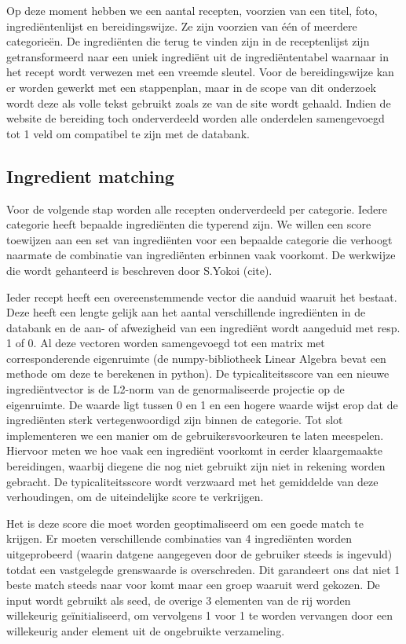 \documentclass{hogent-article}
\begin{document}
Op deze moment hebben we een aantal recepten, voorzien van een titel, foto, ingrediëntenlijst en bereidingswijze. Ze zijn voorzien van één of meerdere categorieën. De ingrediënten die terug te vinden zijn in de receptenlijst zijn getransformeerd naar een uniek ingrediënt uit de ingrediëntentabel waarnaar in het recept wordt verwezen met een vreemde sleutel. Voor de bereidingswijze kan er worden gewerkt met een stappenplan, maar in de scope van dit onderzoek wordt deze als volle tekst gebruikt zoals ze van de site wordt gehaald. Indien de website de bereiding toch onderverdeeld worden alle onderdelen samengevoegd tot 1 veld om compatibel te zijn met de databank.

\subsection{Ingredient matching}%

Voor de volgende stap worden alle recepten onderverdeeld per categorie. Iedere categorie heeft bepaalde ingrediënten die typerend zijn. We willen een score toewijzen aan een set van ingrediënten voor een bepaalde categorie die verhoogt naarmate de combinatie van ingrediënten erbinnen vaak voorkomt. De werkwijze die wordt gehanteerd is beschreven door S.Yokoi (cite).

Ieder recept heeft een overeenstemmende vector die aanduid waaruit het bestaat. Deze heeft een lengte gelijk aan het aantal verschillende ingrediënten in de databank en de aan- of afwezigheid van een ingrediënt wordt aangeduid met resp. 1 of 0. Al deze vectoren worden samengevoegd tot een matrix met  corresponderende eigenruimte (de numpy-bibliotheek Linear Algebra bevat een methode om deze te berekenen in python). De typicaliteitsscore van een nieuwe ingrediëntvector is de L2-norm van de genormaliseerde projectie op de eigenruimte. De waarde ligt tussen 0 en 1 en een hogere waarde wijst erop dat de ingrediënten sterk vertegenwoordigd zijn binnen de categorie. Tot slot implementeren we een manier om de gebruikersvoorkeuren te laten meespelen. Hiervoor meten we hoe vaak een ingrediënt voorkomt in eerder klaargemaakte bereidingen, waarbij diegene die nog niet gebruikt zijn niet in rekening worden gebracht. De typicaliteitsscore wordt verzwaard met het gemiddelde van deze verhoudingen, om de uiteindelijke score te verkrijgen.

Het is deze score die moet worden geoptimaliseerd om een goede match te krijgen. Er moeten verschillende combinaties van 4 ingrediënten worden uitgeprobeerd (waarin datgene aangegeven door de gebruiker steeds is ingevuld) totdat een vastgelegde grenswaarde is overschreden. Dit garandeert ons dat niet 1 beste match steeds naar voor komt maar een groep waaruit werd gekozen. De input wordt gebruikt als seed, de overige 3 elementen van de rij worden willekeurig geïnitialiseerd, om vervolgens 1 voor 1 te worden vervangen door een willekeurig ander element uit de ongebruikte verzameling. 
\end{document}
